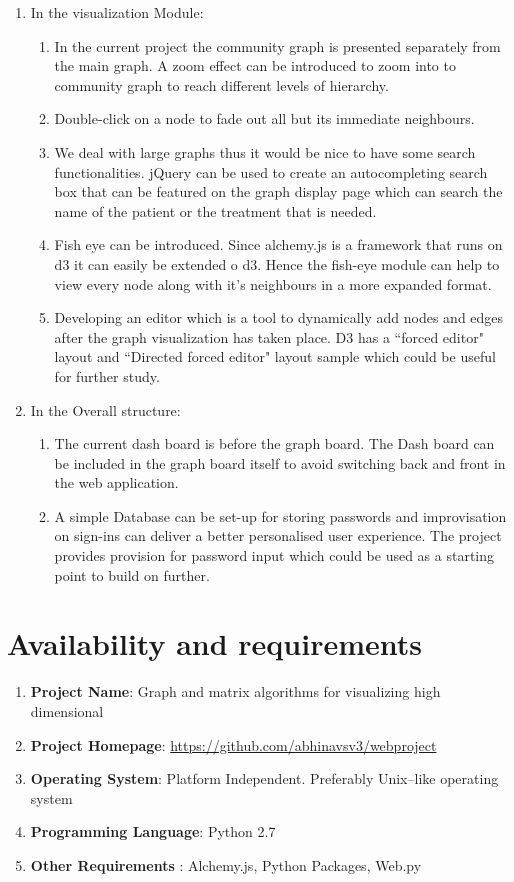 \begin{enumerate}
\item In the visualization Module:
\begin{enumerate}
\item In the current project the community graph is presented separately from the main graph.  A zoom effect can be introduced to zoom into to community graph to reach different levels of hierarchy. 
\item  Double-click on a node to fade out all but its immediate neighbours.
\item We deal with large graphs thus it would be nice to have some search functionalities. jQuery can be used to create an autocompleting search box that can be featured on the graph display page which can search the name of the patient or the treatment that is needed. 
\item Fish eye can be introduced. Since alchemy.js is a framework that runs on d3 it can easily be extended o d3. Hence the fish-eye module can help to view every node along  with it's neighbours in a more expanded format.
\item Developing an editor which is a tool to dynamically add nodes and edges after the graph visualization has taken place. D3 has a ``forced editor" layout and ``Directed forced editor" layout sample which could be useful for further study.
\end{enumerate}
\item In the Overall structure:
\begin{enumerate}
\item The current dash board is before the graph board. The Dash board can be included in the graph board itself to avoid switching back and front in the web application.
\item  A simple Database can be set-up for storing passwords and improvisation on sign-ins can deliver a better personalised user experience. The project provides provision for password input which could be used as a starting point to build on further. 
\end{enumerate}
\end{enumerate}
\section{Availability and requirements}
\begin{enumerate}
\item \textbf{Project Name}: Graph and matrix algorithms for visualizing high dimensional
\item \textbf{Project Homepage}: \url{https://github.com/abhinavsv3/webproject}
\item \textbf{Operating System}: Platform Independent. Preferably Unix--like operating system
\item \textbf{Programming Language}: Python 2.7
\item \textbf{Other Requirements} : Alchemy.js, Python Packages, Web.py
\end{enumerate}

